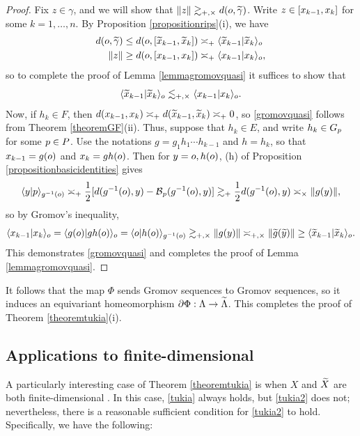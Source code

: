 {\begin{proof}
Fix $z\in\gamma$, and we will show that $\|z\| \gtrsim_{+,\times} d(o,\widetilde\gamma)$. Write $z\in [x_{k - 1},x_k]$ for some $k = 1,\ldots,n$. By Proposition \ref{propositionrips}(i), we have
\begin{align*}
d(o,\widetilde\gamma) &\leq d(o,[\widetilde x_{k - 1},\widetilde x_k]) \asymp_+ \langle \widetilde x_{k - 1} | \widetilde x_k \rangle_o\\
\|z\| &\geq d(o,[x_{k - 1},x_k]) \asymp_+ \langle x_{k - 1} | x_k \rangle_o,
\end{align*}
so to complete the proof of Lemma \ref{lemmagromovquasi} it suffices to show that
\begin{equation}
\label{gromovquasi}
\langle \widetilde x_{k - 1} | \widetilde x_k \rangle_o \lesssim_{+,\times} \langle x_{k - 1} | x_k \rangle_o.
\end{equation}
Now, if $h_k\in F$, then $d(x_{k - 1},x_k) \asymp_+ d(\widetilde x_{k - 1},\widetilde x_k) \asymp_+ 0$, so \eqref{gromovquasi} follows from Theorem \ref{theoremGF}(ii). Thus, suppose that $h_k\in E$, and write $h_k\in G_p$ for some $p\in P$. Use the notations $g = g_1 h_1\cdots h_{k - 1}$ and $h = h_k$, so that $x_{k - 1} = g(o)$ and $x_k = gh(o)$. Then for $y = o,h(o)$, (h) of Proposition \ref{propositionbasicidentities} gives
\[
\langle y|p\rangle_{g^{-1}(o)} \asymp_+ \frac12[d(g^{-1}(o),y) - \operatorname{\mathcal B}_p(g^{-1}(o),y)] \gtrsim_+ \frac12d(g^{-1}(o),y) \asymp_\times \|g(y)\|,
\]
so by Gromov's inequality,
\[
\langle x_{k - 1} | x_k \rangle_o = \langle g(o)|gh(o)\rangle_o = \langle o|h(o)\rangle_{g^{-1}(o)} \gtrsim_{+,\times} \|g(y)\| \asymp_{+,\times} \|\widetilde g(\widetilde y)\| \geq \langle \widetilde x_{k - 1} | \widetilde x_k \rangle_o. 
\]
This demonstrates \eqref{gromovquasi} and completes the proof of Lemma \ref{lemmagromovquasi}.
\end{proof}

It follows that the map $\Phi$ sends Gromov sequences to Gromov sequences, so it induces an equivariant homeomorphism $\partial\Phi:\Lambda\to \widetilde\Lambda$. This completes the proof of Theorem \ref{theoremtukia}(i).


\subsection{Applications to finite-dimensional \CROSSs}
A particularly interesting case of Theorem \ref{theoremtukia} is when $X$ and $\widetilde X$ are both finite-dimensional \CROSSs. In this case, \eqref{tukia} always holds, but \eqref{tukia2} does not; nevertheless, there is a reasonable sufficient condition for \eqref{tukia2} to hold. Specifically, we have the following:

}
